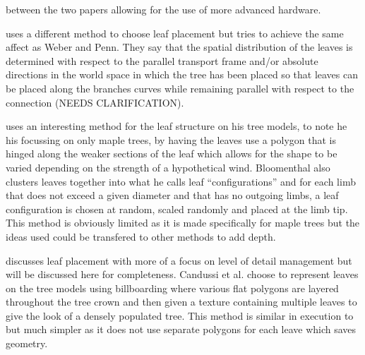 \documentclass[review]{cmpreport}
\begin{document}
between the two papers allowing for the use of more advanced hardware. \par
\cite{runions2007colonization} uses a different method to choose leaf placement but tries 
to achieve the same affect as Weber and Penn. They say that the spatial distribution of the 
leaves is determined with respect to the parallel transport frame and/or absolute directions 
in the world space in which the tree has been placed so that leaves can be placed along the 
branches curves while remaining parallel with respect to the connection (NEEDS CLARIFICATION). 
\par
\cite{bloomenthal1985modeling} uses an interesting method for the leaf structure on his tree 
models, to note he his focussing on only maple trees, by having the leaves use a polygon that 
is hinged along the weaker sections of the leaf which allows for the shape to be varied 
depending on the strength of a hypothetical wind. Bloomenthal also clusters leaves together 
into what he calls leaf ``configurations'' and for each limb that does not exceed a given 
diameter and that has no outgoing limbs, a leaf configuration is chosen at random, scaled 
randomly and placed at the limb tip. This method is obviously limited as it is made specifically 
for maple trees but the ideas used could be transfered to other methods to add depth.\par
\cite{candussi2005rendering} discusses leaf placement with more of a focus on level of detail 
management but will be discussed here for completeness. Candussi et al. choose to represent 
leaves on the tree models using billboarding where various flat polygons are layered throughout 
the tree crown and then given a texture containing multiple leaves to give the look of a 
densely populated tree. This method is similar in execution to \cite{bloomenthal1985modeling} 
but much simpler as it does not use separate polygons for each leave which saves geometry.
\end{document}
